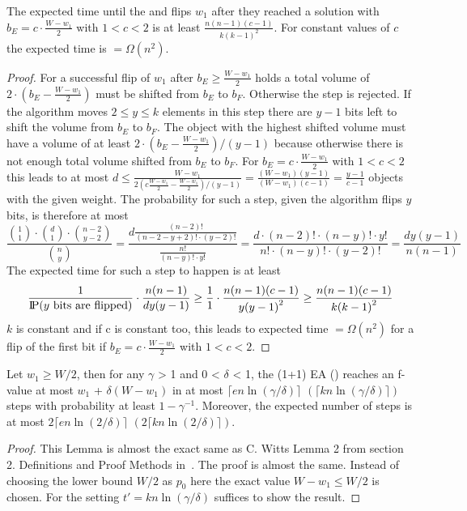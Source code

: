 \begin{lemma}\label{lemma:W1FlipWontHappen}
      The expected time until the \RLSR[k] and \RLSN[k] flips $w_1$ after they reached a solution with $b_E = c\cdot\frac{W-w_1}{2}$ with $1<c<2$ is at least \(\frac{n(n-1)(c-1)}{k{(k-1)}^2}\). For constant values of $c$ the expected time is $=\Omega(n^2)$.
\end{lemma}
\begin{proof}
      For a successful flip of $w_1$ after $b_E \ge \frac{W-w_1}{2}$ holds a total volume of $2\cdot(b_E-\frac{W-w_1}{2})$ must be shifted from $b_E$ to $b_F$.
      Otherwise the step is rejected.
      If the algorithm moves $2\le y\le k$ elements in this step there are $y-1$ bits left to shift the volume from $b_E$ to $b_F$.
      The object with the highest shifted volume must have a volume of at least $2\cdot(b_E-\frac{W-w_1}{2})/(y-1)$ because otherwise there is not enough total volume shifted from $b_E$ to $b_F$.
      For $b_E = c\cdot\frac{W-w_1}{2}$ with $1<c<2$ this leads to at most \(d\le\frac{W-w_1}{2(c\frac{W-w_1}{2}-\frac{W-w_1}{2})/(y-1)}=\frac{(W-w_1)(y-1)}{(W-w_1)(c-1)}=\frac{y-1}{c-1}\) objects with the given weight.
      The probability for such a step, given the algorithm flips $y$ bits, is therefore at most
      \[
            \frac{\binom{1}{1}\cdot\binom{d}{1}\cdot\binom{n-2}{y-2}}{\binom{n}{y}}
            =\frac{d\frac{(n-2)!}{(n-2-y+2)!\cdot (y-2)!}}{\frac{n!}{(n-y)!\cdot y!}}
            =\frac{d\cdot(n-2)!\cdot(n-y)!\cdot y!}{n!\cdot(n-y)!\cdot(y-2)!}
            =\frac{dy(y-1)}{n(n-1)}
            \]
      The expected time for such a step to happen is at least
      \[
            \frac{1}{\text{I\kern-0.15em P}(y\text{ bits are flipped})}\cdot\frac{n(n-1)}{dy(y-1)}
            \ge\frac{1}{1}\cdot\frac{n(n-1)(c-1)}{y{(y-1)}^2}
            \ge\frac{n(n-1)(c-1)}{k{(k-1)}^2}
            \]
      $k$ is constant and if c is constant too, this leads to expected time $=\Omega(n^2)$ for a flip of the first bit if $b_E = c\cdot\frac{W-w_1}{2}$ with $1<c<2$.
\end{proof}

\begin{lemma}\label{lemma:CWittRefined}
      Let $w_1\ge W/2$, then for any $\gamma$ > 1 and 0 < $\delta$ < 1, the (1+1) EA (\RLSR[k]) reaches an f-value at most $w_1$ + $\delta(W-w_1)$ in at most $\lceil en\ln(\gamma/\delta)\rceil$ $(\lceil kn\ln(\gamma/\delta)\rceil)$ steps with probability at least $1-\gamma^{-1}$. Moreover, the expected number of steps is at most $2\lceil en\ln(2/\delta)\rceil$ $(2\lceil kn\ln(2/\delta)\rceil)$.
\end{lemma}
\begin{proof}
      This Lemma is almost the exact same as C. Witts  Lemma 2 from section 2. Definitions and Proof Methods in~\cite{diekert2005stacs}.
      The proof is almost the same.
      Instead of choosing the lower bound $W/2$ as $p_0$ here the exact value $W-w_1\le W/2$ is chosen.
      For the \RLSR[k] setting $t'=kn\ln(\gamma/\delta)$ suffices to show the result.
\end{proof}


